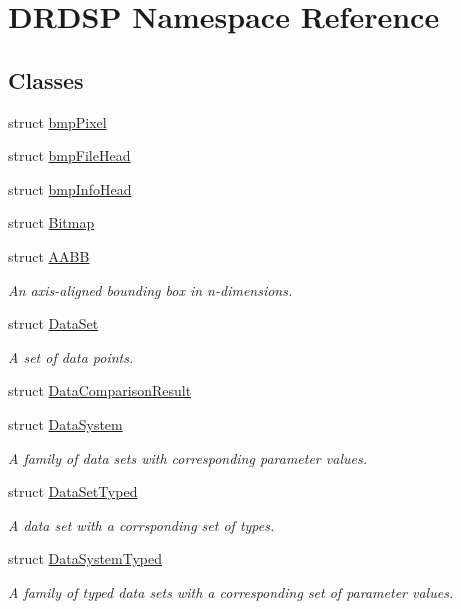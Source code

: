 \hypertarget{namespace_d_r_d_s_p}{\section{D\-R\-D\-S\-P Namespace Reference}
\label{namespace_d_r_d_s_p}
}
\subsection*{Classes}
\begin{DoxyCompactItemize}
\item 
struct \hyperlink{struct_d_r_d_s_p_1_1bmp_pixel}{bmp\-Pixel}
\item 
struct \hyperlink{struct_d_r_d_s_p_1_1bmp_file_head}{bmp\-File\-Head}
\item 
struct \hyperlink{struct_d_r_d_s_p_1_1bmp_info_head}{bmp\-Info\-Head}
\item 
struct \hyperlink{struct_d_r_d_s_p_1_1_bitmap}{Bitmap}
\item 
struct \hyperlink{struct_d_r_d_s_p_1_1_a_a_b_b}{A\-A\-B\-B}
\begin{DoxyCompactList}\small\item\em An axis-\/aligned bounding box in n-\/dimensions. \end{DoxyCompactList}\item 
struct \hyperlink{struct_d_r_d_s_p_1_1_data_set}{Data\-Set}
\begin{DoxyCompactList}\small\item\em A set of data points. \end{DoxyCompactList}\item 
struct \hyperlink{struct_d_r_d_s_p_1_1_data_comparison_result}{Data\-Comparison\-Result}
\item 
struct \hyperlink{struct_d_r_d_s_p_1_1_data_system}{Data\-System}
\begin{DoxyCompactList}\small\item\em A family of data sets with corresponding parameter values. \end{DoxyCompactList}\item 
struct \hyperlink{struct_d_r_d_s_p_1_1_data_set_typed}{Data\-Set\-Typed}
\begin{DoxyCompactList}\small\item\em A data set with a corrsponding set of types. \end{DoxyCompactList}\item 
struct \hyperlink{struct_d_r_d_s_p_1_1_data_system_typed}{Data\-System\-Typed}
\begin{DoxyCompactList}\small\item\em A family of typed data sets with a corresponding set of parameter values. \end{DoxyCompactList}\item 

\end{DoxyCompactItemize}
